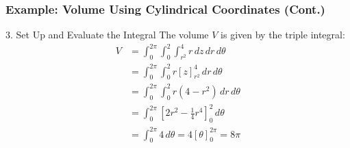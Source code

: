 \documentclass[aspectratio=169, UTF8]{beamer}
\begin{document}
\begin{frame}
\frametitle{Example: Volume Using Cylindrical Coordinates (Cont.)}

\begin{block}{3. Set Up and Evaluate the Integral}
    The volume $V$ is given by the triple integral:
    \begin{align*}
        V &= \int_{0}^{2\pi} \int_{0}^{2} \int_{r^2}^{4} r \, dz \, dr \, d\theta \\
          &= \int_{0}^{2\pi} \int_{0}^{2} r [z]_{r^2}^{4} \, dr \, d\theta \\
          &= \int_{0}^{2\pi} \int_{0}^{2} r(4 - r^2) \, dr \, d\theta \\
          &= \int_{0}^{2\pi} \left[ 2r^2 - \frac{1}{4}r^4 \right]_{0}^{2} \, d\theta \\
          &= \int_{0}^{2\pi} 4 \, d\theta = 4[\theta]_{0}^{2\pi} = 8\pi
    \end{align*}
\end{block}

\end{frame}
\end{document}

